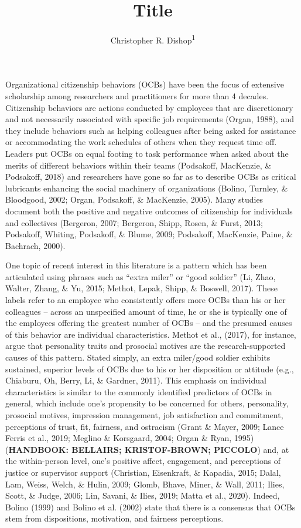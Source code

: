 \documentclass[english,,man]{apa6}
\author{Christopher R. Dishop\textsuperscript{1}}
\affiliation{
\vspace{0.5cm}
\textsuperscript{1} Michigan State University}
\title{Title}
\date{}
\begin{document}
\maketitle

Organizational citizenship behaviors (OCBs) have been the focus of extensive scholarship among researchers and practitioners for more than 4 decades. Citizenship behaviors are actions conducted by employees that are discretionary and not necessarily associated with specific job requirements (Organ, 1988), and they include behaviors such as helping colleagues after being asked for assistance or accommodating the work schedules of others when they request time off. Leaders put OCBs on equal footing to task performance when asked about the merits of different behaviors within their teams (Podsakoff, MacKenzie, \& Podsakoff, 2018) and researchers have gone so far as to describe OCBs as critical lubricants enhancing the social machinery of organizations (Bolino, Turnley, \& Bloodgood, 2002; Organ, Podsakoff, \& MacKenzie, 2005). Many studies document both the positive and negative outcomes of citizenship for individuals and collectives (Bergeron, 2007; Bergeron, Shipp, Rosen, \& Furst, 2013; Podsakoff, Whiting, Podsakoff, \& Blume, 2009; Podsakoff, MacKenzie, Paine, \& Bachrach, 2000).

One topic of recent interest in this literature is a pattern which has been articulated using phrases such as \enquote{extra miler} or \enquote{good soldier} (Li, Zhao, Walter, Zhang, \& Yu, 2015; Methot, Lepak, Shipp, \& Boswell, 2017). These labels refer to an employee who consistently offers more OCBs than his or her colleagues -- across an unspecified amount of time, he or she is typically one of the employees offering the greatest number of OCBs -- and the presumed causes of this behavior are individual characteristics. Methot et al., (2017), for instance, argue that personality traits and prosocial motives are the research-supported causes of this pattern. Stated simply, an extra miler/good soldier exhibits sustained, superior levels of OCBs due to his or her disposition or attitude (e.g., Chiaburu, Oh, Berry, Li, \& Gardner, 2011). This emphasis on individual characteristics is similar to the commonly identified predictors of OCBs in general, which include one's propensity to be concerned for others, personality, prosocial motives, impression management, job satisfaction and commitment, perceptions of trust, fit, fairness, and ostracism (Grant \& Mayer, 2009; Lance Ferris et al., 2019; Meglino \& Korsgaard, 2004; Organ \& Ryan, 1995) (\textbf{HANDBOOK: BELLAIRS; KRISTOF-BROWN; PICCOLO}) and, at the within-person level, one's positive affect, engagement, and perceptions of justice or supervisor support (Christian, Eisenkraft, \& Kapadia, 2015; Dalal, Lam, Weiss, Welch, \& Hulin, 2009; Glomb, Bhave, Miner, \& Wall, 2011; Ilies, Scott, \& Judge, 2006; Lin, Savani, \& Ilies, 2019; Matta et al., 2020). Indeed, Bolino (1999) and Bolino et al. (2002) state that there is a consensus that OCBs stem from dispositions, motivation, and fairness perceptions.
\end{document}
